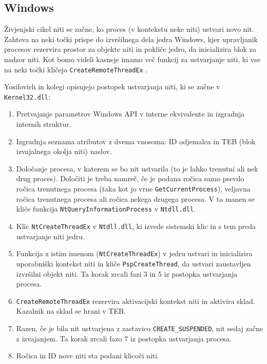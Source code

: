 \documentclass[a4paper,12pt,openright]{book}
\begin{document}
\subsection{Windows}

Živjenjski cikel niti se začne, ko proces (v kontekstu neke niti) ustvari novo nit.
Zahteva na neki točki prispe do izvršilnega dela jedra Windows, kjer upravljanik procesov rezervira prostor za objekte niti in pokliče jedro, da inicializira blok za nadzor niti.
Kot bomo videli kasneje imamo več funkcij za ustvarjanje niti, ki vse na neki točki kličejo \texttt{CreateRemoteThreadEx} \cite{Yosifovich_Russinovich_Solomon_Ionescu_2017}.

Yosifovich in kolegi \cite{Yosifovich_Russinovich_Solomon_Ionescu_2017} opisujejo postopek ustvarjanja niti, ki se začne v \texttt{Kernel32.dll}:
\begin{enumerate}
	\item Pretvajanje parametrov Windows API v interne ekvivalente in izgradnja internih struktur.
	\item Izgradnja seznama atributov z dvema vnosoma: ID odjemalca in TEB (blok izvajalnega okolja niti) naslov.
	\item Določanje procesa, v katerem se bo nit ustvarila (to je lahko trenutni ali nek drug proces). 
	      Določiti je treba namreč, če je podana ročica samo psevdo ročica trenutnega procesa (taka kot jo vrne \texttt{GetCurrentProcess}), veljavna ročica trenutnega procesa ali ročica nekega drugega procesa.
	      V ta manen se kliče funkcija \texttt{NtQueryInformationProcess} v \texttt{Ntdll.dll}.
	\item Klic \texttt{NtCreateThreadEx} v \texttt{Ntdll.dll}, ki izvede sistemski klic in s tem preda ustvarjanje niti jedru.
	\item Funkcija z istim imenom (\texttt{NtCreateThreadEx}) v jedru ustvari in inicializira uporabniški kontekst niti in kliče \texttt{PspCreateThread}, da ustvari zaustavljen izvršilni objekt niti.
	      Ta korak zrcali fazi 3 in 5 iz postopka ustvarjanja procesa.
	\item \texttt{CreateRemoteThreadEx} rezervira aktivacijski kontekst niti in aktivira sklad.
	      Kazalnik na sklad se hrani v TEB.
	\item Razen, če je bila nit ustvarjena z zastavico \texttt{CREATE\_SUSPENDED}, nit sedaj začne z izvajanjem.
	      Ta korak zrcali fazo 7 iz postopka ustvarjanja procesa.
	\item Ročica in ID nove niti sta podani klicoči niti.
\end{enumerate}
\end{document}
